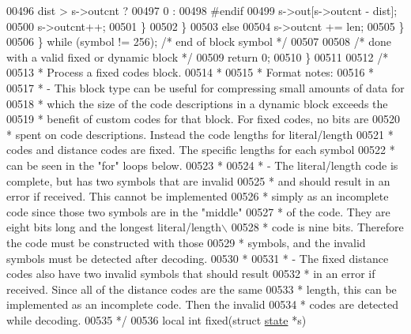 \begin{DoxyCode}
00496                         dist > s->outcnt ?
00497                             0 :
00498 \textcolor{preprocessor}{#endif}
00499                             s->out[s->outcnt - dist];
00500                     s->outcnt++;
00501                 \}
00502             \}
00503             \textcolor{keywordflow}{else}
00504                 s->outcnt += len;
00505         \}
00506     \} \textcolor{keywordflow}{while} (symbol != 256);            \textcolor{comment}{/* end of block symbol */}
00507 
00508     \textcolor{comment}{/* done with a valid fixed or dynamic block */}
00509     \textcolor{keywordflow}{return} 0;
00510 \}
00511 
00512 \textcolor{comment}{/*}
00513 \textcolor{comment}{ * Process a fixed codes block.}
00514 \textcolor{comment}{ *}
00515 \textcolor{comment}{ * Format notes:}
00516 \textcolor{comment}{ *}
00517 \textcolor{comment}{ * - This block type can be useful for compressing small amounts of data for}
00518 \textcolor{comment}{ *   which the size of the code descriptions in a dynamic block exceeds the}
00519 \textcolor{comment}{ *   benefit of custom codes for that block.  For fixed codes, no bits are}
00520 \textcolor{comment}{ *   spent on code descriptions.  Instead the code lengths for literal/length}
00521 \textcolor{comment}{ *   codes and distance codes are fixed.  The specific lengths for each symbol}
00522 \textcolor{comment}{ *   can be seen in the "for" loops below.}
00523 \textcolor{comment}{ *}
00524 \textcolor{comment}{ * - The literal/length code is complete, but has two symbols that are invalid}
00525 \textcolor{comment}{ *   and should result in an error if received.  This cannot be implemented}
00526 \textcolor{comment}{ *   simply as an incomplete code since those two symbols are in the "middle"}
00527 \textcolor{comment}{ *   of the code.  They are eight bits long and the longest literal/length\(\backslash\)}
00528 \textcolor{comment}{ *   code is nine bits.  Therefore the code must be constructed with those}
00529 \textcolor{comment}{ *   symbols, and the invalid symbols must be detected after decoding.}
00530 \textcolor{comment}{ *}
00531 \textcolor{comment}{ * - The fixed distance codes also have two invalid symbols that should result}
00532 \textcolor{comment}{ *   in an error if received.  Since all of the distance codes are the same}
00533 \textcolor{comment}{ *   length, this can be implemented as an incomplete code.  Then the invalid}
00534 \textcolor{comment}{ *   codes are detected while decoding.}
00535 \textcolor{comment}{ */}
00536 local \textcolor{keywordtype}{int} fixed(\textcolor{keyword}{struct} \hyperlink{structstate}{state} *s)

\end{DoxyCode}
